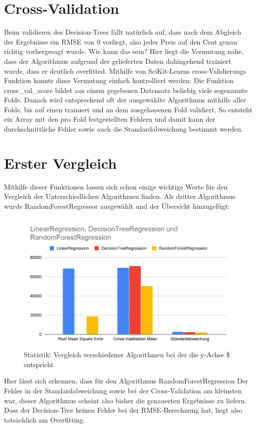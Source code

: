 \section{Cross-Validation}
\label{crossValidation}
Beim validieren des Decision-Trees fällt natürlich auf, dass nach dem Abgleich der Ergebnisse ein \ac{RMSE} von 0 vorliegt, also jeder Preis auf den Cent genau richtig vorhergesagt wurde. Wie kann das sein? 
Hier liegt die Vermutung nahe, dass der Algorithmus aufgrund der gelieferten Daten dahingehend trainiert wurde, dass er deutlich overfitted.
Mithilfe von SciKit-Learns cross-Validierungs Funktion konnte diese Vermutung einfach kontrolliert werden: Die Funktion cross\_val\_score bildet aus einem gegebenen Datensatz beliebig viele sogenannte Folds. Danach wird entsprechend oft der ausgewählte Algorithmus mithilfe aller Folds, bis auf einen trainiert und an dem ausgelassenen Fold validiert. So entsteht ein Array mit den pro Fold festgestellten Fehlern und damit kann der durchschnittliche Fehler sowie auch die Standardabweichung bestimmt werden.


\section{Erster Vergleich}
\label{ErsterVergleich}
Mithilfe dieser Funktionen lassen sich schon einige wichtige Werte für den Vergleich der Unterschiedlichen Algorithmen finden.
Als dritter Algorithmus wurde RandomForestRegressor ausgewählt und der Übersicht hinzugefügt:
\newline
\begin{figure}
	\includegraphics[width=1.0\textwidth]{../Bilder/imageLikeEmbed.png}
	\caption{Statistik: Vergleich verschiedener Algorithmen bei der die y-Achse \$ entspricht}
\end{figure}
Hier lässt sich erkennen, dass für den Algorithmus RandomForestRegression Der Fehler in der Standardabweichung sowie bei der Cross-Validation am kleinsten war, dieser Algorithmus scheint also bisher die genauesten Ergebnisse zu liefern. Dass der Decision-Tree keinen Fehler bei der \ac{RMSE}-Berechnung hat, liegt also tatsächlich am Overfitting.


